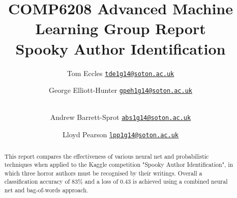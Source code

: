 \documentclass[10pt,a4paper]{ieeeconf}
\begin{document}
  \title{
  COMP6208 Advanced Machine Learning Group Report\\
  \vspace{5mm}
    Spooky Author Identification
  }
  \author{
    Tom Eccles \texttt{\href{mailto:tde1g14@soton.ac.uk}{tde1g14@soton.ac.uk}} \and
    George Elliott-Hunter \texttt{\href{mailto:gpeh1g14@soton.ac.uk}{gpeh1g14@soton.ac.uk}} \and \\
    Andrew Barrett-Sprot \texttt{\href{mailto:abs1g14@soton.ac.uk}{abs1g14@soton.ac.uk}} \and
    Lloyd Pearson \texttt{\href{mailto:lpp1g14@soton.ac.uk}{lpp1g14@soton.ac.uk}} \and
  }

  \maketitle
  \begin{abstract}
    This report compares the effectiveness of various neural net and probabilistic techniques when applied to the Kaggle competition "Spooky Author Identification", in which three horror authors must be recognised by their writings. Overall a classification accuracy of 83\% and a loss of 0.43 is achieved using a combined neural net and bag-of-words approach.
  \end{abstract}
  
  
  
  
  
  
  
  
    
  \printbibliography
  
\end{document}
